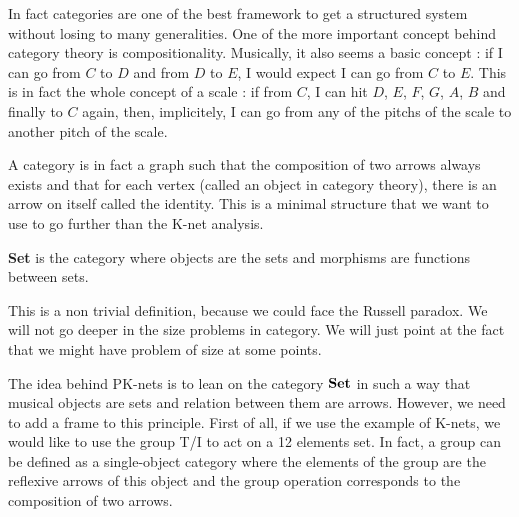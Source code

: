In fact categories are one of the best framework to get a structured system without losing to many generalities.
One of the more important concept behind category theory is compositionality. Musically, it also seems a basic concept : if I can go from $C$ to $D$ and from $D$ to $E$, I would expect I can go from $C$ to $E$. This is in fact the whole concept of a scale : if from $C$, I can hit $D$, $E$, $F$, $G$, $A$, $B$ and finally to $C$ again, then, implicitely, I can go from any of the pitchs of the scale to another pitch of the scale.

A category is in fact a graph such that the composition of two arrows always exists and that for each vertex (called an object in category theory), there is an arrow on itself called the identity. This is a minimal structure that we want to use to go further than the K-net analysis.

\begin{defn}\textbf{Set}\label{nomencl:Set} is the category where objects are the sets and morphisms are functions between sets.
\end{defn}

This is a non trivial definition, because we could face the Russell paradox. We will not go deeper in the size problems in category. We will just point at the fact that we might have problem of size at some points.




The idea behind PK-nets is to lean on the category $\bf Set$ in such a way that musical objects are sets and relation between them are arrows. However, we need to add a frame to this principle. First of all, if we use the example of K-nets, we would like to use the group T/I to act on a 12 elements set. In fact, a group can be defined as a single-object category where the elements of the group are the reflexive arrows of this object and the group operation corresponds to the composition of two arrows.

